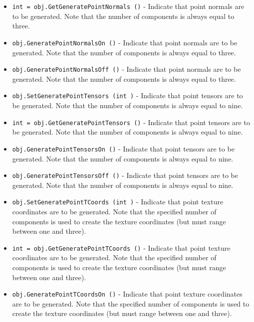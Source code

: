\begin{itemize}
\item  \verb|int = obj.GetGeneratePointNormals ()| -  Indicate that point normals are to be generated. Note that the
 number of components is always equal to three.

\item  \verb|obj.GeneratePointNormalsOn ()| -  Indicate that point normals are to be generated. Note that the
 number of components is always equal to three.

\item  \verb|obj.GeneratePointNormalsOff ()| -  Indicate that point normals are to be generated. Note that the
 number of components is always equal to three.

\item  \verb|obj.SetGeneratePointTensors (int )| -  Indicate that point tensors are to be generated. Note that the
 number of components is always equal to nine.

\item  \verb|int = obj.GetGeneratePointTensors ()| -  Indicate that point tensors are to be generated. Note that the
 number of components is always equal to nine.

\item  \verb|obj.GeneratePointTensorsOn ()| -  Indicate that point tensors are to be generated. Note that the
 number of components is always equal to nine.

\item  \verb|obj.GeneratePointTensorsOff ()| -  Indicate that point tensors are to be generated. Note that the
 number of components is always equal to nine.

\item  \verb|obj.SetGeneratePointTCoords (int )| -  Indicate that point texture coordinates are to be generated. Note that
 the specified number of components is used to create the texture
 coordinates (but must range between one and three).

\item  \verb|int = obj.GetGeneratePointTCoords ()| -  Indicate that point texture coordinates are to be generated. Note that
 the specified number of components is used to create the texture
 coordinates (but must range between one and three).

\item  \verb|obj.GeneratePointTCoordsOn ()| -  Indicate that point texture coordinates are to be generated. Note that
 the specified number of components is used to create the texture
 coordinates (but must range between one and three).


\end{itemize}
